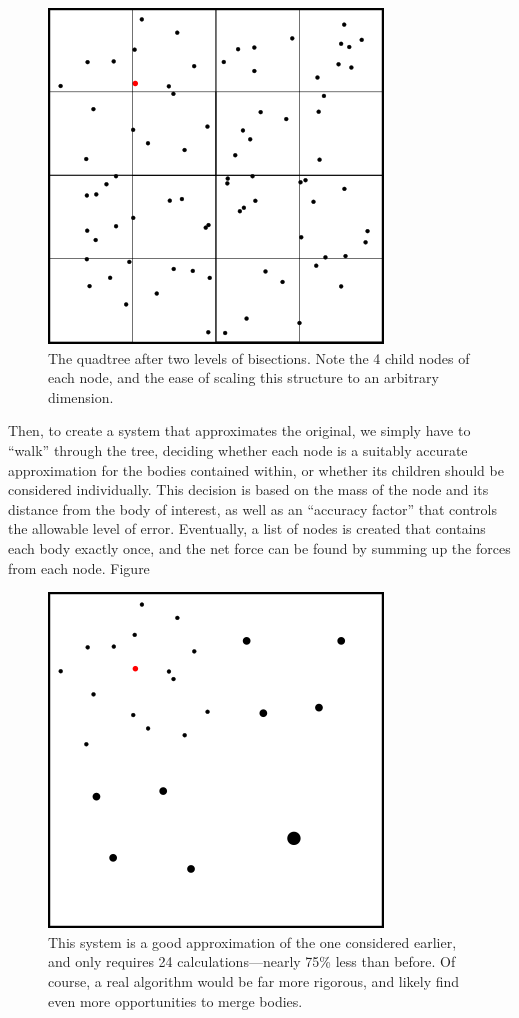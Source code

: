 \documentclass[12pt,twoside]{reedthesis}
\begin{document}
\begin{figure}[p]
	\includegraphics{imgs/treecode-nodelev2}
	\caption{The quadtree after two levels of bisections. Note the 4 child nodes of each node, and the ease of scaling this structure to an arbitrary dimension.}
	\label{treecode-nodelev2}
\end{figure}

Then, to create a system that approximates the original, we simply have to ``walk'' through the tree, deciding whether each node is a suitably accurate approximation for the bodies contained within, or whether its children should be considered individually. This decision is based on the mass of the node and its distance from the body of interest, as well as an ``accuracy factor'' that controls the allowable level of error. Eventually, a list of nodes is created that contains each body exactly once, and the net force can be found by summing up the forces from each node. Figure

\begin{figure}[p]
	\includegraphics{imgs/treecode-nodes-final}
	\caption{This system is a good approximation of the one considered earlier, and only requires 24 calculations---nearly 75\% less than before. Of course, a real algorithm would be far more rigorous, and likely find even more opportunities to merge bodies.}
	\label{treecode-nodes-final}
\end{figure}
\end{document}
